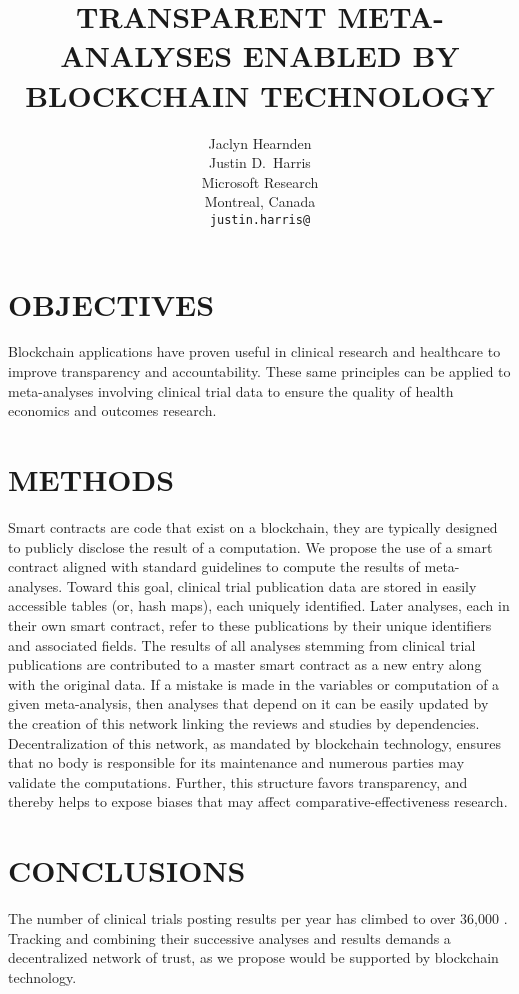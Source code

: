 \documentclass{article}
\title{TRANSPARENT META-ANALYSES ENABLED BY BLOCKCHAIN TECHNOLOGY}
\author{
  Jaclyn Hearnden \\
   \And
  Justin D.~Harris \\
  Microsoft Research\\
  Montreal, Canada \\
  \texttt{justin.harris@}
}
\begin{document}
\maketitle



\section{OBJECTIVES}
\label{sec:objectives}
Blockchain applications have proven useful in clinical research and healthcare to improve transparency and accountability.
These same principles can be applied to meta-analyses involving clinical trial data to ensure the quality of health economics and outcomes research.


\section{METHODS}
\label{sec:methods}
Smart contracts are code that exist on a blockchain, they are typically designed to publicly disclose the result of a computation.
We propose the use of a smart contract aligned with standard guidelines to compute the results of meta-analyses.
Toward this goal, clinical trial publication data are stored in easily accessible tables (or, hash maps), each uniquely identified.
Later analyses, each in their own smart contract, refer to these publications by their unique identifiers and associated fields.
The results of all analyses stemming from clinical trial publications are contributed to a master smart contract as a new entry along with the original data.
If a mistake is made in the variables or computation of a given meta-analysis, then analyses that depend on it can be easily updated by the creation of this network linking the reviews and studies by dependencies.
Decentralization of this network, as mandated by blockchain technology, ensures that no body is responsible for its maintenance and numerous parties may validate the computations.
Further, this structure favors transparency, and thereby helps to expose biases that may affect comparative-effectiveness research.

\section{CONCLUSIONS}
\label{sec:conclusions}
The number of clinical trials posting results per year has climbed to over 36,000 \cite{ClinicalTrialsTrends}.
Tracking and combining their successive analyses and results demands a decentralized network of trust, as we propose would be supported by blockchain technology. 

  

\end{document}

